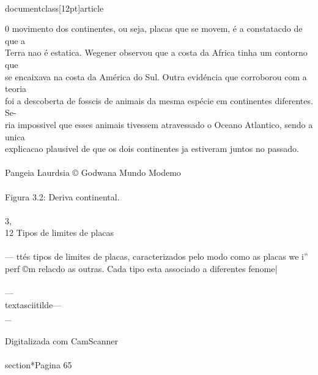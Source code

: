 \\documentclass[12pt]{article}
\begin{document}
0 movimento dos continentes, ou seja, placas que se movem, é a constatacdo de que a\\
Terra nao é estatica. Wegener observou que a costa da Africa tinha um contorno que\\
se encaixava na costa da América do Sul. Outra evidéncia que corroborou com a teoria\\
foi a descoberta de fosscis de animais da mesma espécie em continentes diferentes. Se-\\
ria impossivel que esses animais tivessem atravessado o Oceano Atlantico, sendo a unica\\
explicacao plausivel de que os dois continentes ja estiveram juntos no passado.\\
\\
Pangeia Laurdsia © Godwana Mundo Modemo\\
\\
Figura 3.2: Deriva continental.\\
\\
3,\\
12 Tipos de limites de placas\\
\\
— ttés tipos de limites de placas, caracterizados pelo modo como as placas we i”\\
perf ©m relacdo as outras. Cada tipo esta associado a diferentes fenome|\\
\\
 —\\textasciitilde{}— \\_\\
\\
Digitalizada com CamScanner\\

\\section*{Pagina 65}
\end{document}

